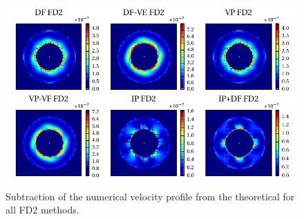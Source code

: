 \begin{figure}[!bp]
  \includegraphics{gfx/immersed_boundary/tcflow/long/vz_profiles_o2.pdf}
  \caption{\label{tcflow:results_vprofiles_o2}
    Subtraction of the numerical velocity profile from the theoretical
        for all FD2 methods.}
\end{figure}

